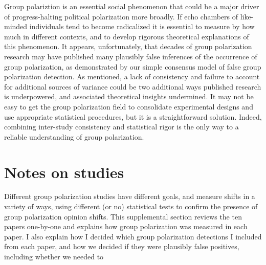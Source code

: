 \documentclass[12pt, letterpaper]{article}
\begin{document}
Group polariztion is an essential social phenomenon that could be a major driver of
progress-halting political polarization more broadly. If echo chambers of like-minded
individuals tend to become radicalized it is essential to measure by how much
in different contexts, and to develop rigorous theoretical explanations of
this phenomenon. It appears, unfortunately, that decades of group polarization
research may have published many plausibly false inferences of the
occurrence of group polarization, as demonstrated by our simple consensus
model of false group polarization detection. As mentioned, a lack of
consistency and failure to account for additional sources of variance could
be two additional ways published research is underpowered, and associated
theoretical insights undermined. It may not be easy to get the group polarization field to 
consolidate experimental designs and use appropriate statistical procedures,
but it is a straightforward solution. Indeed, combining inter-study consistency and statistical
rigor is the only way to a reliable understanding of group polarization.



\setlength{\bibleftmargin}{.125in}
\setlength{\bibindent}{-\bibleftmargin}



\appendix

\section{Notes on studies}

Different group polarization studies have different goals, and measure shifts
in a variety of ways, using different (or no) statistical tests to confirm
the presence of group polarization opinion shifts. This supplemental section
reviews the ten papers one-by-one and explains how group 
polarization was measured in each paper. I also explain how I decided which
group polarization detections I included from each paper, and how we decided
if they were plausibly false positives, including whether we needed to 
\end{document}
